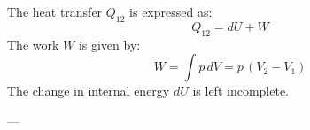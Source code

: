 The heat transfer \( Q_{12} \) is expressed as:  
\[
Q_{12} = dU + W
\]  
The work \( W \) is given by:  
\[
W = \int p \, dV = p \, (V_2 - V_1)
\]  
The change in internal energy \( dU \) is left incomplete.

---